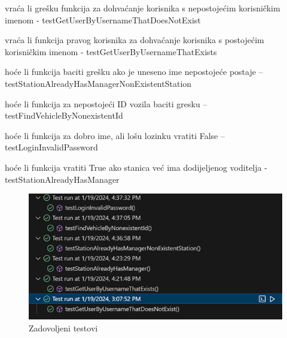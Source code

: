 			\begin{packed_item}
					\item vraća li grešku funkcija za dohvaćanje korisnika s nepostojećim korisničkim imenom - testGetUserByUsernameThatDoesNotExist
					\item vraća li funkcija pravog korisnika za dohvaćanje korisnika s postojećim korisničkim imenom -  testGetUserByUsernameThatExists
					\item hoće li funkcija baciti grešku ako je uneseno ime nepostojeće postaje – testStationAlreadyHasManagerNonExistentStation
					\item hoće li funkcija za nepostojeći ID vozila baciti gresku – testFindVehicleByNonexistentId
					\item hoće li funkcija za dobro ime, ali lošu lozinku vratiti False – testLoginInvalidPassword
					\item hoće li funkcija vratiti True ako stanica već ima dodijeljenog voditelja - testStationAlreadyHasManager
				\end{packed_item}
			
			
			\begin{figure}[H]
				\includegraphics[scale=0.85]{slike/Zadovoljeni testovi.png}
				\centering
				\caption{Zadovoljeni testovi}
				\label{fig:Zadovoljeni testovi}
			\end{figure}


